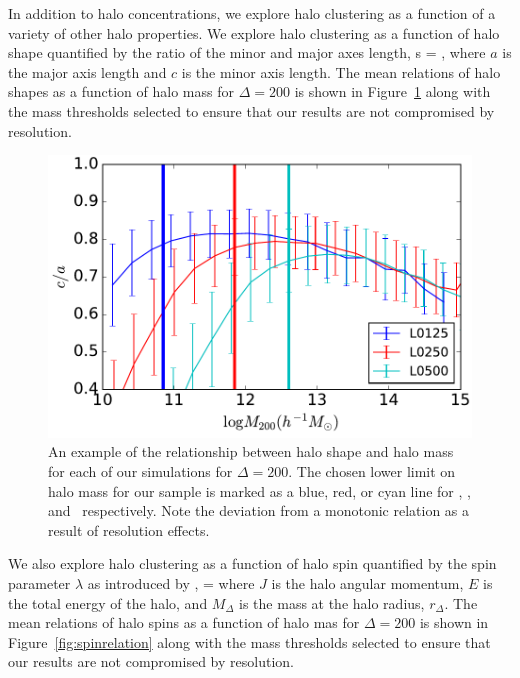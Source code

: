 \documentclass[usenatbib,usegraphicx,letterpaper]{mn2e}
\begin{document}
In addition to halo concentrations, we explore halo clustering as a function of a variety of other 
halo properties. We explore halo clustering as a function of halo shape quantified by the ratio of 
the minor and major axes length, 
\beq
s = ,
\eeq
where $a$ is the major axis length and $c$ is the minor axis length. The mean relations of halo shapes 
as a function of halo mass for $\Delta=200$ is shown in Figure~\ref{fig:srelation} along with the mass 
thresholds selected to ensure that our results are not compromised by resolution.


\begin{figure}
\centering
\includegraphics[width=.5\textwidth]{masscut_shape_d200.pdf}
\caption{
An example of the relationship between halo shape and 
halo mass for each of our simulations for $\Delta =200$. The chosen 
lower limit on halo mass for our sample is marked as a blue, red, or 
cyan line for \simA, \simB, and \simC \ respectively. Note the deviation from a monotonic relation as a result of
resolution effects.
}
\label{fig:srelation}
\end{figure}

We also explore halo clustering as a function of halo spin quantified 
by the spin parameter $\lambda$ as introduced by \citep{peebles69},
\beq
\lambda = 
\eeq
where $J$ is the halo angular momentum, $E$ is the total energy of the 
halo, and $M_{\Delta}$ is the mass at the halo radius, $r_{\Delta}$. 
The mean relations of halo spins as a function of halo mas for $\Delta=200$ 
is shown in Figure~\ref{fig:spinrelation} along with the mass thresholds 
selected to ensure that our results are not compromised by resolution.
\end{document}
